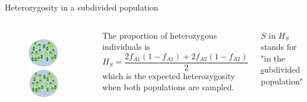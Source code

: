 \begin{frame}{Heterozygosity in a subdivided population}

        \begin{columns}


                \begin{figure}
			\includegraphics[width=0.8\textwidth]{Pics/predivision} \
                        \includegraphics[width=0.8\textwidth]{Pics/division}
                \end{figure}


		The proportion of heterozygous individuals is
                \begin{equation}
                        H_S = \frac{2f_{A1}(1-f_{A1}) + 2f_{A2}(1-f_{A2})}{2}
                \end{equation}
		which is the expected heterozygosity when both populations are sampled.

		\bigskip

		\small{$S$ in $H_S$ stands for "in the \underline{s}ubdivided population"}
	
        \end{columns}

\end{frame}


